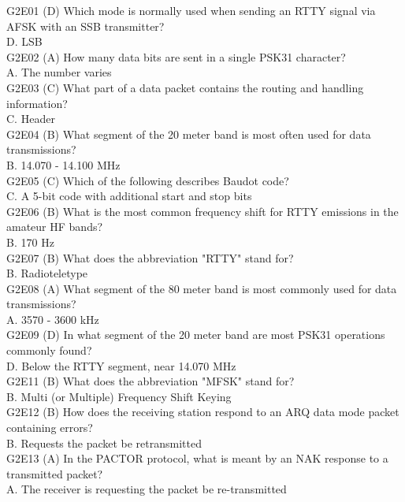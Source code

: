 \documentclass[12pt,letterpaper]{report}
\begin{document}
G2E01 (D) Which mode is normally used when sending an RTTY signal via AFSK with an SSB transmitter?\\
D. LSB\\

G2E02 (A) How many data bits are sent in a single PSK31 character?\\
A. The number varies\\

G2E03 (C) What part of a data packet contains the routing and handling information?\\
C. Header\\

G2E04 (B) What segment of the 20 meter band is most often used for data transmissions?\\
B. 14.070 - 14.100 MHz\\

G2E05 (C) Which of the following describes Baudot code?\\
C. A 5-bit code with additional start and stop bits\\

G2E06 (B) What is the most common frequency shift for RTTY emissions in the amateur HF bands?\\
B. 170 Hz\\

G2E07 (B) What does the abbreviation "RTTY" stand for?\\
B. Radioteletype\\

G2E08 (A) What segment of the 80 meter band is most commonly used for data transmissions?\\
A. 3570 - 3600 kHz\\

G2E09 (D) In what segment of the 20 meter band are most PSK31 operations commonly found?\\
D. Below the RTTY segment, near 14.070 MHz\\

G2E11 (B) What does the abbreviation "MFSK" stand for?\\
B. Multi (or Multiple) Frequency Shift Keying\\

G2E12 (B) How does the receiving station respond to an ARQ data mode packet containing errors?\\
B. Requests the packet be retransmitted\\

G2E13 (A) In the PACTOR protocol, what is meant by an NAK response to a transmitted packet?\\
A. The receiver is requesting the packet be re-transmitted\\
\end{document}

